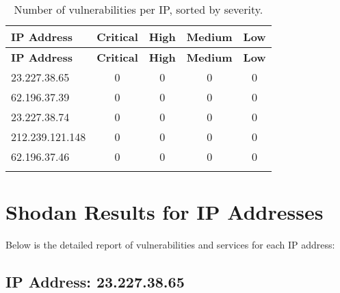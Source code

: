 \documentclass{article}
\begin{document}
\begin{longtable}{|>{\raggedright\arraybackslash}p{3cm}|c|c|c|c|}
    \hline
    \textbf{IP Address} & \textbf{Critical} & \textbf{High} & \textbf{Medium} & \textbf{Low} \\
    \hline
    \endfirsthead
    \hline
    \textbf{IP Address} & \textbf{Critical} & \textbf{High} & \textbf{Medium} & \textbf{Low} \\
    \hline
    \endhead
    \hline
    \endfoot
    \endlastfoot
    
    
    
    \rowcolor{lightgreen} %
    
    23.227.38.65 & 0 & 0 & 0 & 0 \\
    \hline
    
    
    \rowcolor{lightgreen} %
    
    62.196.37.39 & 0 & 0 & 0 & 0 \\
    \hline
    
    
    \rowcolor{lightgreen} %
    
    23.227.38.74 & 0 & 0 & 0 & 0 \\
    \hline
    
    
    \rowcolor{lightgreen} %
    
    212.239.121.148 & 0 & 0 & 0 & 0 \\
    \hline
    
    
    \rowcolor{lightgreen} %
    
    62.196.37.46 & 0 & 0 & 0 & 0 \\
    \hline
    
    \caption{Number of vulnerabilities per IP, sorted by severity.} \\
\end{longtable}

\clearpage

\section{Shodan Results for IP Addresses}

Below is the detailed report of vulnerabilities and services for each IP address:



\subsection{IP Address: 23.227.38.65}
\end{document}
